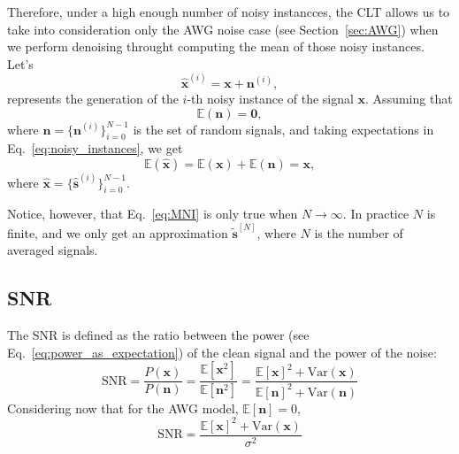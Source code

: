 Therefore, under a high enough number of noisy instancces, the
\gls{CLT} allows us to take into consideration only the \gls{AWG}
noise case (see Section~\ref{sec:AWG}) when we perform denoising
throught computing the mean of those noisy instances. Let's
\begin{equation}
  \hat{\bm{x}}^{(i)} = \bm{x} + \bm{n}^{(i)},
  \label{eq:noisy_instances}
\end{equation}
represents the generation of the $i$-th noisy instance of the signal
$\bm{x}$. Assuming that
\begin{equation}
  \mathbb{E}(\bm{n})=\bm{0},
\end{equation}
where $\bm{n}=\{\bm{n}^{(i)}\}_{i=0}^{N-1}$ is the set of
random signals, and taking expectations in
Eq.~\ref{eq:noisy_instances}, we get
\begin{equation}
  \mathbb{E}(\hat{\bm{x}}) = \mathbb{E}(\bm{x}) + \mathbb{E}(\bm{n}) = \bm{x},
  \label{eq:MNI}
\end{equation}
where $\hat{\bm{x}}=\{\hat{\bm{s}}^{(i)}\}_{i=0}^{N-1}$.

Notice, however, that Eq.~\ref{eq:MNI} is only true when
$N\rightarrow\infty$. In practice $N$ is finite, and we only get an
approximation $\tilde{\bm{s}}^{[N]}$, where $N$ is the number of
averaged signals.



\subsection{\gls{SNR}}
The \gls{SNR} is defined as the ratio between the power (see
Eq.~\ref{eq:power_as_expectation}) of the clean signal and the power of
the noise:
\begin{equation}
  \text{SNR} = \frac{P(\bm{x})}{P(\bm{n})} = \frac{\mathbb{E}[\bm{x}^2]}{\mathbb{E}[\bm{n}^2]} = \frac{\mathbb{E}[\bm{x}]^2+\text{Var}(\bm{x})}{\mathbb{E}[\bm{n}]^2+\text{Var}(\bm{n})}
\end{equation}
Considering now that for the \gls{AWG} model, $\mathbb{E}[\bm{n}] = 0$,
\begin{equation}
  \text{SNR} = \frac{\mathbb{E}[\bm{x}]^2+\text{Var}(\bm{x})}{\sigma^2}
\end{equation}

